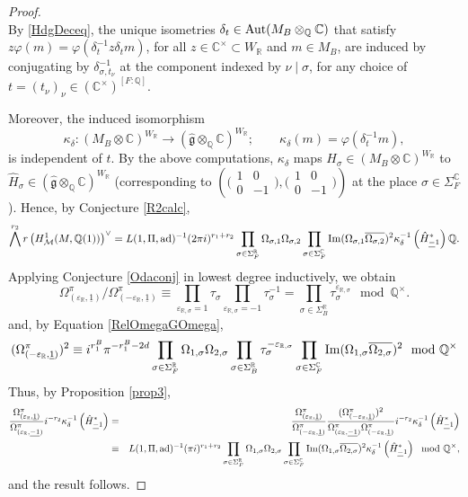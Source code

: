 \documentclass{amsart}
\theoremstyle{definition}
\theoremstyle{remark}
\numberwithin{equation}{section}
\newcommand{\Q}{{\mathbb Q}}
\newcommand{\C}{{\mathbb C}}
\newcommand{\R}{{\mathbb R}}
\newcommand{\cM}{{\mathcal M}}
\newcommand{\mfg}{{\mathfrak g}}
\begin{document}
\begin{proof}
\[\]
By \eqref{HdgDeceq}, the unique isometries $\delta_t\in {\rm Aut}(M_B\otimes_\Q\C)$ that satisfy $z\varphi(m)=\varphi(\delta_t^{-1}z \delta_tm)$, for all $z\in \C^\times\subset W_\R$ and $m\in M_B$, are induced by conjugating by $\delta_{\sigma,t_\nu}^{-1}$ at the component indexed by $\nu\mid\sigma$, for any choice of $t=(t_\nu)_\nu\in(\C^\times)^{[F:\Q]}$.

Moreover, the induced isomorphism
\[
\kappa_\delta:(M_B\otimes\C)^{W_\R}\longrightarrow (\hat\mfg\otimes_\Q\C)^{W_\R};\qquad \kappa_\delta(m)=\varphi(\delta_t^{-1}m),
\]
is independent of $t$. By the above computations, $\kappa_\delta$ maps $H_\sigma\in (M_B\otimes\C)^{W_\R}$ to $\hat H_\sigma\in (\hat\mfg\otimes_\Q\C)^{W_\R}$ (corresponding to $\left(\big(\begin{smallmatrix}1&0\\0&-1\end{smallmatrix}\big),\big(\begin{smallmatrix}1&0\\0&-1\end{smallmatrix}\big)\right)$ at the place $\sigma\in \Sigma_F^\C$). Hence, by Conjecture \ref{R2calc},
\[
 \bigwedge^{r_2}r\left(H^1_{\cM}(M,\Q(1))\right)^{\vee}=L(1,\Pi,{\rm ad})^{-1}(2\pi i)^{r_1+r_2}\prod_{\sigma\in\Sigma_F^\R}\Omega_{{\sigma},1}\Omega_{{\sigma},2}\prod_{\sigma\in\Sigma_F^\C}{\rm Im}(\Omega_{\sigma,1}\overline{\Omega_{\sigma,2}})^{2}\kappa_\delta^{-1}\left(\hat H_{{\underline -1}}^\ast\right)\Q.
\]
Applying Conjecture \ref{Odaconj} in lowest degree inductively, we obtain
\[
\Omega^\pi_{(\varepsilon_\R,\underline 1)}/\Omega^\pi_{(-\varepsilon_\R,\underline 1)}\equiv \prod_{{\varepsilon_{\R,\sigma}=1}}\tau_{{\sigma}}\prod_{\varepsilon_{\R,\sigma}=-1}\tau_{{\sigma}}^{-1}=\prod_{\sigma\in\Sigma_B^\R}\tau_{{\sigma}}^{\varepsilon_{\R,\sigma}}\mod \Q^\times.
\]
and, by Equation \eqref{RelOmegaGOmega},
\[
(\Omega^\pi_{(-\varepsilon_\R,\underline{1})})^2\equiv i^{r_1^B}\pi^{-r_1^B-2d}\prod_{\sigma\in\Sigma_F^\R}\Omega_{1,\sigma}\Omega_{2,\sigma}\prod_{\sigma\in\Sigma_B^\R}\tau_\sigma^{-\varepsilon_{\R,\sigma}}\prod_{\sigma\in\Sigma_F^\C}{\rm Im}(\Omega_{1,\sigma}\overline{\Omega_{2,\sigma}})^2\mod\Q^\times
\]
Thus, by Proposition \ref{prop3},
\begin{eqnarray*}
\frac{\Omega_{(\varepsilon_\R,\underline 1)}^\pi}{\Omega_{(\varepsilon_\R,\underline{-1})}^\pi}i^{-r_2}\kappa_\delta^{-1}\left(\hat H_{{\underline -1}}^\ast\right)&=&\frac{\Omega_{(\varepsilon_\R,\underline 1)}^\pi}{\Omega_{(-\varepsilon_\R,\underline{1})}^\pi}\frac{(\Omega_{(-\varepsilon_\R,\underline{1})}^\pi)^2}{\Omega_{(\varepsilon_\R,\underline{-1})}^\pi\Omega_{(-\varepsilon_\R,\underline{1})}^\pi}i^{-r_2}\kappa_\delta^{-1}\left(\hat H_{{\underline -1}}^\ast\right)\\
&\equiv& L(1,\Pi,{\rm ad})^{-1}(\pi i)^{r_1+r_2}\prod_{\sigma\in\Sigma_F^\R}\Omega_{1,\sigma}\Omega_{2,\sigma}\prod_{\sigma\in\Sigma_F^\C}{\rm Im}(\Omega_{1,\sigma}\overline{\Omega_{2,\sigma}})^2\kappa_\delta^{-1}\left(\hat H_{{\underline -1}}^\ast\right)\mod \Q^\times,
\end{eqnarray*}
and the result follows.
\end{proof}
\end{document}
